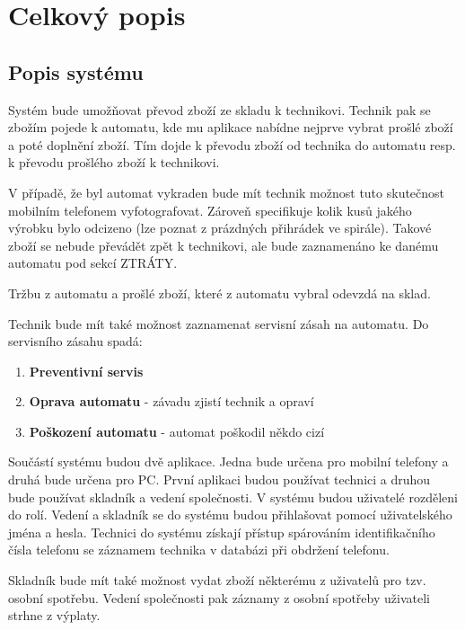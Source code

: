 \documentclass[a4paper,10pt]{article}
\begin{document}
\section{Celkový popis}
\subsection{Popis systému}
Systém bude umožňovat převod zboží ze skladu k technikovi. Technik pak se zbožím pojede k automatu, kde mu aplikace nabídne nejprve vybrat prošlé zboží a poté doplnění zboží. Tím dojde k převodu zboží od technika do automatu resp. k převodu prošlého zboží k technikovi.

V případě, že byl automat vykraden bude mít technik možnost tuto skutečnost mobilním telefonem vyfotografovat. Zároveň specifikuje kolik kusů jakého výrobku bylo odcizeno (lze poznat z prázdných přihrádek ve spirále). Takové zboží se nebude převádět zpět k technikovi, ale bude zaznamenáno ke danému automatu pod sekcí ZTRÁTY.

Tržbu z automatu a prošlé zboží, které z automatu vybral odevzdá na sklad.

Technik bude mít také možnost zaznamenat servisní zásah na automatu. Do servisního zásahu spadá:
\begin{enumerate}
	\item \textbf{Preventivní servis}
	\item \textbf{Oprava automatu} - závadu zjistí technik a opraví
	\item \textbf{Poškození automatu} - automat poškodil někdo cizí
\end{enumerate}

Součástí systému budou dvě aplikace. Jedna bude určena pro mobilní telefony a druhá bude určena pro PC. První aplikaci budou používat technici a druhou bude používat skladník a vedení společnosti. V systému budou uživatelé rozděleni do rolí. Vedení a skladník se do systému budou přihlašovat pomocí uživatelského jména a hesla. Technici do systému získají přístup spárováním identifikačního čísla telefonu se záznamem technika v databázi při obdržení telefonu.

Skladník bude mít také možnost vydat zboží některému z uživatelů pro tzv. osobní spotřebu. Vedení společnosti pak záznamy z osobní spotřeby uživateli strhne z výplaty.
\end{document}

